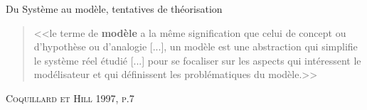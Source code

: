 \documentclass[newPxFont]{beamer}
\begin{document}
\begin{frame}[c]{Du Système au modèle, tentatives de théorisation}
 \vspace{-1em}
  \begin{quote}
    <<le terme de \textbf{modèle} a la même signification que celui de concept ou d'hypothèse ou d'analogie [...], un modèle est une abstraction qui simplifie le système réel étudié [...] pour se focaliser sur les aspects qui intéressent le modélisateur et qui définissent les problématiques du modèle.>>
  \end{quote}
  \hspace*{\fill}\textsc{Coquillard et Hill 1997, p.7}
  \vspace{-0.5em}
  \begin{figure}
   	\centering
   		 \hspace{0.2em} %
       \hspace{0.2em} %
   		 \hspace{0.2em} %
  \end{figure}
\end{frame}
\end{document}
